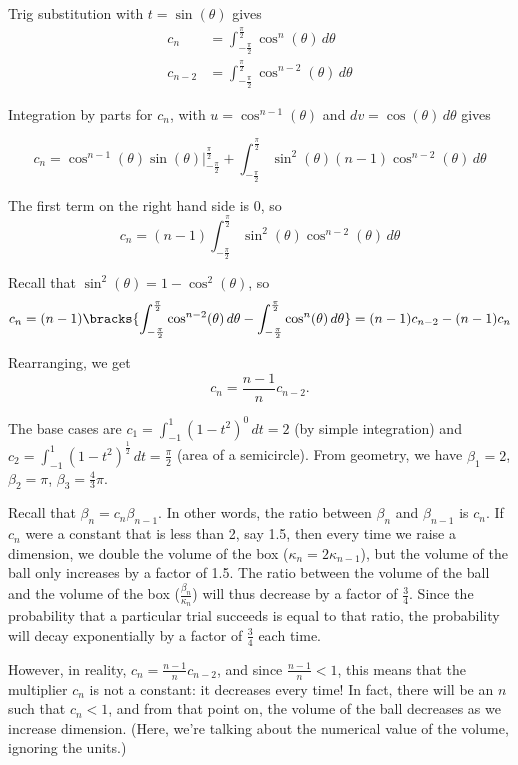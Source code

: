 \documentclass{article}
\begin{document}
Trig substitution with $t = \sin(\theta)$ gives
\begin{align*}
    c_n     & = \int_{-\frac{\pi}{2}}^{\frac{\pi}{2}} \cos^{n}(\theta) \, d\theta   \\
    c_{n-2} & = \int_{-\frac{\pi}{2}}^{\frac{\pi}{2}} \cos^{n-2}(\theta) \, d\theta
\end{align*}

Integration by parts for $c_n$, with $u = \cos^{n-1}(\theta)$ and $dv = \cos(\theta) \, d\theta$ gives

\[
    c_n = \cos^{n-1}(\theta) \sin(\theta) \bigg|_{-\frac{\pi}{2}}^{\frac{\pi}{2}} + \int_{-\frac{\pi}{2}}^{\frac{\pi}{2}} \sin^2(\theta) (n-1) \cos^{n-2}(\theta) \, d\theta
\]

The first term on the right hand side is 0, so
\[
    c_n = (n-1) \int_{-\frac{\pi}{2}}^{\frac{\pi}{2}} \sin^2(\theta) \cos^{n-2}(\theta) \, d\theta
\]

Recall that $\sin^2(\theta) = 1 - \cos^2(\theta)$, so
\[
    c_n = (n-1) \bracks{\int_{-\frac{\pi}{2}}^{\frac{\pi}{2}} \cos^{n-2}(\theta) \, d\theta - \int_{-\frac{\pi}{2}}^{\frac{\pi}{2}} \cos^n(\theta) \, d\theta} = (n-1) c_{n-2} - (n-1) c_n
\]

Rearranging, we get
\[
    c_n = \frac{n-1}{n}c_{n-2}.
\]

The base cases are $c_1 = \int_{-1}^1 (1 - t^2)^0 \, dt = 2$ (by simple integration) and $c_2 = \int_{-1}^1 (1 - t^2)^{\frac{1}{2}} \, dt = \frac{\pi}{2}$ (area of a semicircle). From geometry, we have $\beta_1 = 2$, $\beta_2 = \pi$, $\beta_3 = \frac{4}{3}\pi$.

Recall that $\beta_n = c_n \beta_{n - 1}$. In other words, the ratio between $\beta_n$ and $\beta_{n - 1}$ is $c_n$. If $c_n$ were a constant that is less than 2, say 1.5, then every time we raise a dimension, we double the volume of the box ($\kappa_{n} = 2 \kappa_{n - 1}$), but the volume of the ball only increases by a factor of 1.5. The ratio between the volume of the ball and the volume of the box ($\frac{\beta_n}{\kappa_n}$) will thus decrease by a factor of $\frac{3}{4}$. Since the probability that a particular trial succeeds is equal to that ratio, the probability will decay exponentially by a factor of $\frac{3}{4}$ each time.

However, in reality, $c_n = \frac{n-1}{n}c_{n-2}$, and since $\frac{n-1}{n} < 1$, this means that the multiplier $c_n$ is not a constant: it decreases every time! In fact, there will be an $n$ such that $c_n < 1$, and from that point on, the volume of the ball decreases as we increase dimension. (Here, we're talking about the numerical value of the volume, ignoring the units.)
\end{document}
